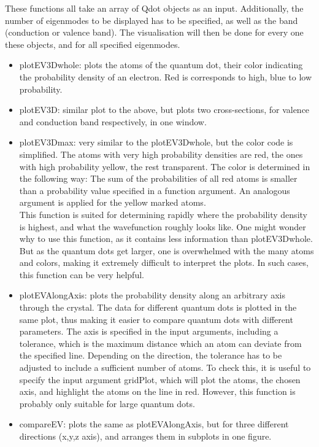 These functions all take an array of Qdot objects as an input. Additionally, the number of eigenmodes to be displayed has to be specified, as well as the band (conduction or valence band). The visualisation will then be done for every one these objects, and for all specified eigenmodes.
\begin{itemize}

\item plotEV3Dwhole: plots the atoms of the quantum dot, their color indicating the probability density of an electron. Red is corresponds to high, blue to low probability.
\item plotEV3D: similar plot to the above, but plots two cross-sections, for valence and conduction band respectively, in one window.
\item plotEV3Dmax: very similar to the plotEV3Dwhole, but the color code is simplified. The atoms with very high probability densities are red, the ones with high probability yellow, the rest transparent. The color is determined in the following way: The sum of the probabilities of all red atoms is smaller than a probability value specified in a function argument. An analogous argument is applied for the yellow marked atoms.\\
This function is suited for determining rapidly where the probability density is highest, and what the wavefunction roughly looks like. One might wonder why to use this function, as it contains less information than plotEV3Dwhole. But as the quantum dots get larger, one is overwhelmed with the many atoms and colors, making it extremely difficult to interpret the plots. In such cases, this function can be very helpful.
\item  plotEVAlongAxis: plots the probability density along an arbitrary axis through the crystal. The data for different quantum dots is plotted in the same plot, thus making it easier to compare quantum dots with different parameters. The axis is specified in the input arguments, including a tolerance, which is the maximum distance which an atom can deviate from the specified line. Depending on the direction, the tolerance has to be adjusted to include a sufficient number of atoms. To check this, it is useful to specify the input argument gridPlot, which will plot the atoms, the chosen axis, and highlight the atoms on the line in red. However, this function is probably only suitable for large quantum dots. 
\item compareEV: plots the same as plotEVAlongAxis, but for three different directions (x,y,z axis), and arranges them in subplots in one figure.
\end{itemize}














